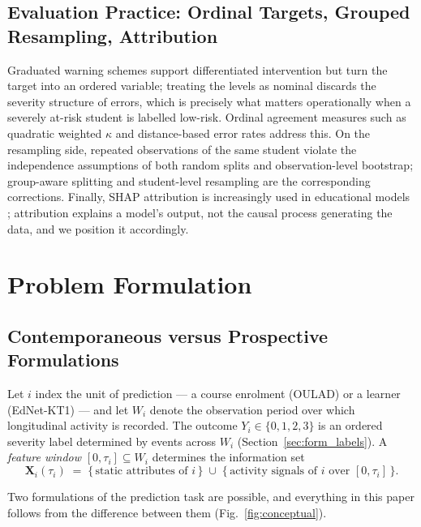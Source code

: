 \documentclass[sn-mathphys,Numbered]{sn-jnl}
\begin{document}
\subsection{Evaluation Practice: Ordinal Targets, Grouped Resampling, Attribution}\label{sec:rw_eval}

Graduated warning schemes support differentiated intervention \cite{Arnold2012,Pistolesi2017} but turn the target into an ordered variable; treating the levels as nominal discards the severity structure of errors, which is precisely what matters operationally when a severely at-risk student is labelled low-risk. Ordinal agreement measures such as quadratic weighted $\kappa$ \cite{Cohen1960,Landis1977} and distance-based error rates address this. On the resampling side, repeated observations of the same student violate the independence assumptions of both random splits and observation-level bootstrap; group-aware splitting and student-level resampling are the corresponding corrections. Finally, SHAP attribution \cite{Lundberg2017} is increasingly used in educational models \cite{Marcolino2025,Mustofa2025}; attribution explains a model's output, not the causal process generating the data, and we position it accordingly.

\section{Problem Formulation}\label{sec:formulation}

\subsection{Contemporaneous versus Prospective Formulations}\label{sec:form_prospective}

Let $i$ index the unit of prediction --- a course enrolment (OULAD) or a learner (EdNet-KT1) --- and let $W_i$ denote the observation period over which longitudinal activity is recorded. The outcome $Y_i \in \{0,1,2,3\}$ is an ordered severity label determined by events across $W_i$ (Section~\ref{sec:form_labels}). A \emph{feature window} $[0, \tau_i] \subseteq W_i$ determines the information set
\begin{equation}
  \mathbf{X}_i(\tau_i) \;=\; \{\,\text{static attributes of } i\,\} \;\cup\; \{\,\text{activity signals of } i \text{ over } [0, \tau_i]\,\}.
\end{equation}

Two formulations of the prediction task are possible, and everything in this paper follows from the difference between them (Fig.~\ref{fig:conceptual}).
\end{document}

